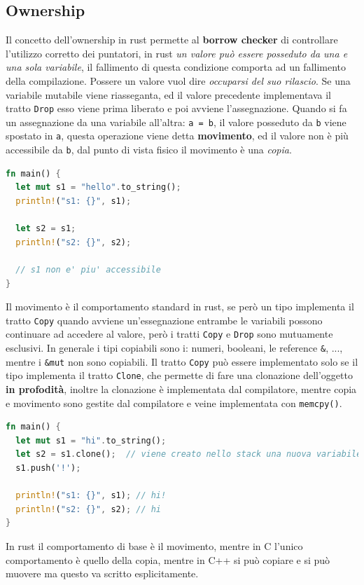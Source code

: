 \documentclass[12pt]{article}
\begin{document}
\subsection{Ownership}
Il concetto dell'ownership in rust permette al \textbf{borrow checker} di controllare l'utilizzo corretto dei puntatori, in rust \emph{un valore pu\`o essere posseduto da una e una sola variabile}, il fallimento di questa condizione comporta ad un fallimento della compilazione. Possere un valore vuol dire \emph{occuparsi del suo rilascio}. Se una variabile mutabile viene riasseganta, ed il valore precedente implementava il tratto \texttt{Drop} esso viene prima liberato e poi avviene l'assegnazione. Quando si fa un assegnazione da una variabile all'altra: \texttt{a = b}, il valore posseduto da \texttt{b} viene spostato in \texttt{a}, questa operazione viene detta \textbf{movimento}, ed il valore non \`e pi\`u accessibile da \texttt{b}, dal punto di vista fisico il movimento \`e una \emph{copia}.
\begin{lstlisting}[language=rust]
fn main() {
  let mut s1 = "hello".to_string();
  println!("s1: {}", s1);

  let s2 = s1;
  println!("s2: {}", s2);

  // s1 non e' piu' accessibile
}
\end{lstlisting}
Il movimento \`e il comportamento standard in rust, se per\`o un tipo implementa il tratto \texttt{Copy} quando avviene un'essegnazione entrambe le variabili possono continuare ad accedere al valore, per\`o i tratti \texttt{Copy} e \texttt{Drop} sono mutuamente esclusivi. In generale i tipi copiabili sono i: numeri, booleani, le reference \texttt{\&}, ..., mentre i \texttt{\&mut} non sono copiabili. Il tratto \texttt{Copy} pu\`o essere implementato solo se il tipo implementa il tratto \texttt{Clone}, che permette di fare una clonazione dell'oggetto \textbf{in profodit\`a}, inoltre la clonazione \`e implementata dal compilatore, mentre copia e movimento sono gestite dal compilatore e veine implementata con \texttt{memcpy()}.
\begin{lstlisting}[language=rust]
fn main() {
  let mut s1 = "hi".to_string();
  let s2 = s1.clone();  // viene creato nello stack una nuova variabile e nell'heap un nuovo valore
  s1.push('!');

  println!("s1: {}", s1); // hi!
  println!("s2: {}", s2); // hi
}
\end{lstlisting}
In rust il comportamento di base \`e il movimento, mentre in C l'unico comportamento \`e quello della copia, mentre in C++ si pu\`o copiare e si pu\`o muovere ma questo va scritto esplicitamente.
\end{document}
